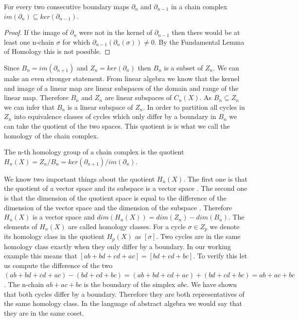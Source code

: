 \begin{cor}  For every two consecutive boundary maps $\partial_n$ and $\partial_{n-1}$ in a chain complex $im(\partial_n) \subseteq ker(\partial_{n-1})$. \end{cor}

\begin{proof}
    If the image of $\partial_n$ were not in the kernel of $\partial_{n-1}$ then there would be at least one n-chain $\sigma$ for which $\partial_{n-1}(\partial_n(\sigma)) \ne 0$. By the Fundamental Lemma of Homology this is not possible.
\end{proof}



Since $B_n = im(\partial_{n+1})$ and $Z_n = ker(\partial_n)$ then $B_n$ is a subset of $Z_n$. We can make an even stronger statement. From linear algebra \cite[p. 59]{lin-alg-done-right} we know that the kernel and image of a linear map are linear subspaces of the domain and range of the linear map. Therefore $B_n$ and $Z_n$ are linear subspaces of $C_n(X)$. As $B_n \subseteq Z_n$ we can infer that $B_n$ is a linear subspace of $Z_n$. In order to partition all cycles in $Z_n$ into equivalence classes of cycles which only differ by a boundary in $B_n$ we can take the quotient of the two spaces. This quotient is is what we call the homology of the chain complex.

\begin{defn} The n-th homology group of a chain complex is the quotient $H_n(X) = Z_n \big/ B_n = ker(\partial_{n+1})\big/im(\partial_n)$. \end{defn}

We know two important things about the quotient $H_n(X)$. The first one is that the quotient of a vector space and its subspace is a vector space \cite[p. 91]{lin-alg-done-right}. The second one is that the dimension of the quotient space is equal to the difference of the dimension of the vector space and the dimension of the subspace \cite{lin-alg-done-right}. Therefore $H_n(X)$ is a vector space and $dim(H_n(X)) = dim(Z_n) - dim(B_n)$. The elements of $H_n(X)$ are called homology classes. For a cycle $\sigma \in Z_p$ we denote its homology class in the quotient $H_p(X)$ as $[\sigma]$. Two cycles are in the same homology class exactly when they only differ by a boundary. In our working example this means that $[ab + bd + cd + ac] = [bd + cd + bc]$. To verify this let us compute the difference of the two $(ab + bd + cd + ac) - (bd + cd + bc) = (ab + bd + cd + ac) + (bd + cd + bc) = ab + ac + bc$. The n-chain $ab + ac + bc$ is the boundary of the simplex
$abc$. We have shown that both cycles differ by a boundary. Therefore they are both representatives of the same homology class. In the language of abstract algebra we would say that they are in the same coset.

